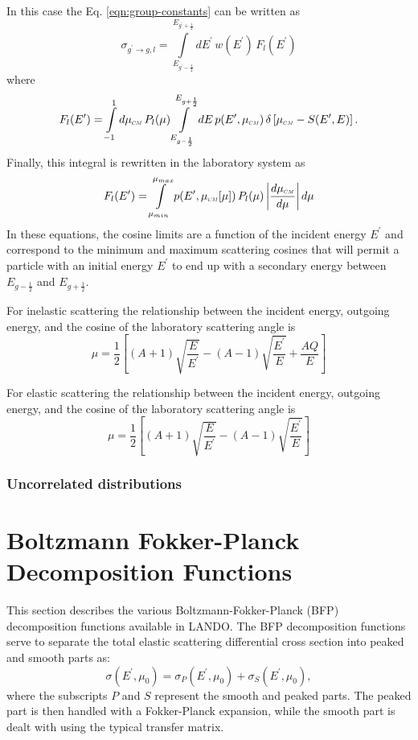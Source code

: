 \documentclass[../main.tex]{subfiles}
\begin{document}
In this case the Eq. \eqref{eqn:group-constants} can be written as
\begin{equation}
  \sigma_{g^{\prime}\rightarrow g,l} = \int\limits_{E_{g^{\prime}-\frac{1}{2}}}^{E_{g^{\prime}+\frac{1}{2}}} dE^{\prime} \, w(E^{\prime}) \, F_l(E^{\prime})
\end{equation}
where
\begin{equation}
  F_l(E^{\prime}) = \int\limits_{-1}^{1} d\mucm \, P_l(\mu) \int\limits_{E_{g-\frac{1}{2}}}^{E_{g+\frac{1}{2}}} dE \, p(E^{\prime},\mucm) \, \delta\left[\mucm - S(E^{\prime},E)\right].
\end{equation}
Finally, this integral is rewritten in the laboratory system as
\begin{equation}
  F_l(E^{\prime}) = \int\limits_{\mu_{min}}^{\mu_{max}} p(E^{\prime},\mucm[\mu]) \, P_l(\mu) \left| \dfrac{d\mucm}{d\mu} \right|d\mu 
\end{equation}
In these equations, the cosine limits are a function of the incident energy $E^{\prime}$ and correspond to the minimum and maximum scattering cosines that will permit a particle with an initial energy $E^{\prime}$ to end up with a secondary energy between $E_{g-\frac{1}{2}}$ and $E_{g+\frac{1}{2}}$.

For inelastic scattering the relationship between the incident energy, outgoing energy, and the cosine of the laboratory scattering angle is
\begin{equation}
  \mu = \dfrac{1}{2} \left[ (A+1) \sqrt{\frac{E}{E^{\prime}}} - (A-1) \sqrt{\frac{E^{\prime}}{E}} + \dfrac{AQ}{E} \right]
\end{equation}

For elastic scattering the relationship between the incident energy, outgoing energy, and the cosine of the laboratory scattering angle is
\begin{equation}
  \mu = \dfrac{1}{2} \left[ (A+1) \sqrt{\frac{E}{E^{\prime}}} - (A-1) \sqrt{\frac{E^{\prime}}{E}} \right]
\end{equation}

\subsubsection{Uncorrelated distributions}

\section{Boltzmann Fokker-Planck Decomposition Functions}
This section describes the various Boltzmann-Fokker-Planck (BFP) decomposition functions available in LANDO. The BFP decomposition functions serve to separate the total elastic scattering differential cross section into peaked and smooth parts as:
\begin{equation}
    \sigma(E^{\prime},\mu_0) = \sigma_P(E^{\prime},\mu_0) + \sigma_S(E^{\prime},\mu_0), 
\end{equation}
where the subscripts $P$ and $S$ represent the smooth and peaked parts. The peaked part is then handled with a Fokker-Planck expansion, while the smooth part is dealt with using the typical transfer matrix.
\end{document}
